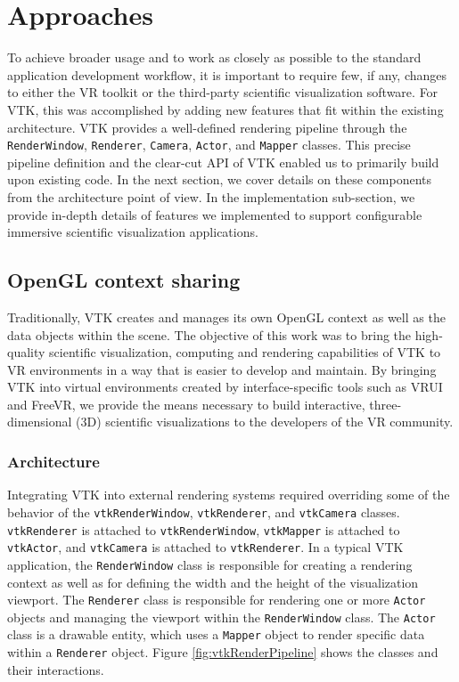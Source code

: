 \section{Approaches}

To achieve broader usage and to work as closely as possible to the standard application development workflow, it is important to require few, if any, changes to either the VR toolkit or the third-party scientific visualization software.
For VTK, this was accomplished by adding new features that fit within the existing architecture. 
VTK provides a well-defined rendering pipeline through the \texttt{RenderWindow}, \texttt{Renderer}, \texttt{Camera}, \texttt{Actor}, and \texttt{Mapper} classes.
This precise pipeline definition and the clear-cut API of VTK enabled us to primarily build upon
existing code.
In the next section, we cover details on these components from the architecture point of view.
In the implementation sub-section, we provide in-depth details of features we implemented to support configurable immersive scientific visualization applications. 

\subsection{OpenGL context sharing}

Traditionally, VTK creates and manages its own OpenGL context as well as the data objects within the scene.
The objective of this work was to bring the high-quality scientific visualization, computing and rendering capabilities of VTK to VR environments in a way that is easier to develop and maintain.
By bringing VTK into virtual environments created by interface-specific tools such as VRUI and FreeVR, we provide the means necessary to build interactive, three-dimensional (3D) scientific visualizations to the developers of the VR community.

\subsubsection{Architecture}

Integrating VTK into external rendering systems required overriding some of the behavior of the \texttt{vtkRenderWindow}, \texttt{vtkRenderer}, and \texttt{vtkCamera} classes.
\texttt{vtkRenderer} is attached to \texttt{vtkRenderWindow}, \texttt{vtkMapper} is attached to \texttt{vtkActor}, and \texttt{vtkCamera} is attached to \texttt{vtkRenderer}.
In a typical VTK application, the \texttt{RenderWindow} class is responsible for creating a rendering context as well as for defining the width and the height of the visualization viewport.
The \texttt{Renderer} class is responsible for rendering one or more
\texttt{Actor} objects and managing the viewport within the \texttt{RenderWindow} class.
The \texttt{Actor} class is a drawable entity, which uses a \texttt{Mapper} object to render specific data within a \texttt{Renderer} object.
Figure \ref{fig:vtkRenderPipeline} shows the classes and their interactions.

